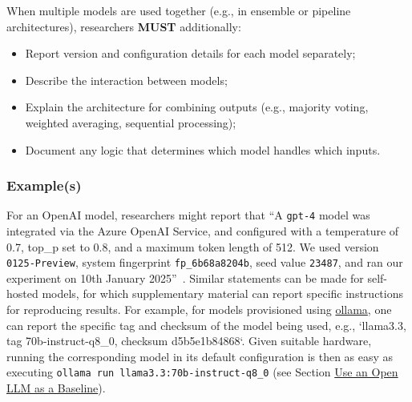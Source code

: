 

When multiple models are used together (e.g., in ensemble or pipeline architectures), researchers \textbf{MUST} additionally:
\begin{itemize}
\item Report version and configuration details for each model separately;
\item Describe the interaction between models;
\item Explain the architecture for combining outputs (e.g., majority voting, weighted averaging, sequential processing);
\item Document any logic that determines which model handles which inputs.
\end{itemize}

\subsubsection{Example(s)}

For an OpenAI model, researchers might report that ``A  \texttt{gpt-4} model was integrated via the Azure OpenAI Service, and configured with a temperature of 0.7, top\_p set to 0.8, and a maximum token length of 512. We used version \texttt{0125-Preview}, system fingerprint \texttt{fp\_6b68a8204b}, seed value \texttt{23487}, and ran our experiment on 10th January 2025''~\cite{OpenAI25, Azure25}.
Similar statements can be made for self-hosted models, for which supplementary material can report specific instructions for reproducing results.
For example, for models provisioned using \href{https://ollama.com/library/}{ollama}, one can report the specific tag and checksum of the model being used, e.g., `llama3.3, tag 70b-instruct-q8\_0, checksum d5b5e1b84868`.
Given suitable hardware, running the corresponding model in its default configuration is then as easy as executing \texttt{ollama run llama3.3:70b-instruct-q8\_0} (see Section \href{/guidelines/#use-an-open-llm-as-a-baseline}{Use an Open LLM as a Baseline}).

